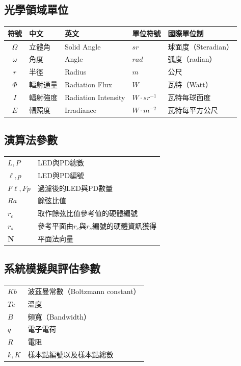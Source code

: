 \onehalfspacing

\subsection*{光學領域單位}

\begin{longtable}[l]{cllll}
    符號& 中文& 英文 & 單位符號&國際單位制\\\hline
    $\Omega$ & 立體角&Solid Angle& $sr$&球面度（Steradian） \\
    $\omega$ & 角度&Angle& $rad$&弧度（radian）\\
    $r$ & 半徑&Radius&  $m$ &公尺\\
    $\Phi$ & 輻射通量&Radiation Flux& $W$&瓦特（Watt）\\
    $I$ & 輻射強度&Radiation Intensity & $W\cdot sr^{-1}$&瓦特每球面度 \\
    $E$ & 輻照度&Irradiance&$W\cdot m^{-2}$ &瓦特每平方公尺\\
\end{longtable}


\onehalfspacing

\subsection*{演算法參數}

\begin{longtable}[l]{ll}
    $L,P$ & LED與PD總數\\
    $\ell,p$ & LED與PD編號\\
    $F\ell,Fp$ & 過濾後的LED與PD數量\\
    $Ra$& 餘弦比值\\
    $r_c$& 取作餘弦比值參考值的硬體編號\\
    $r_s$& 參考平面由$r_c$與$r_s$編號的硬體資訊獲得\\
    $\boldsymbol{N}$& 平面法向量\\
\end{longtable}

\onehalfspacing

\subsection*{系統模擬與評估參數}

\begin{longtable}[l]{ll}
    $Kb$&波茲曼常數（Boltzmann constant）\\
    $Te$& 溫度\\
    $B$& 頻寬（Bandwidth）\\
    $q$&電子電荷\\
    $R$&電阻\\
    $k,K$&樣本點編號以及樣本點總數\\

\end{longtable}


